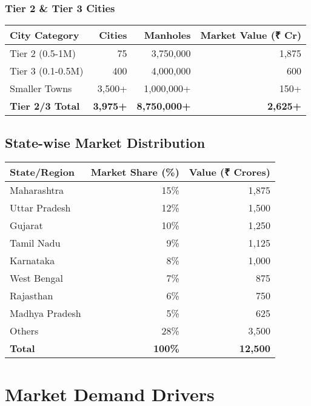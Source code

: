 \documentclass[11pt,a4paper]{article}
\begin{document}
\subsubsection{Tier 2 \& Tier 3 Cities}
\begin{center}
\begin{tabular}{lrrr}
\toprule
\textbf{City Category} & \textbf{Cities} & \textbf{Manholes} & \textbf{Market Value (₹ Cr)} \\
\midrule
Tier 2 (0.5-1M) & 75 & 3,750,000 & 1,875 \\
Tier 3 (0.1-0.5M) & 400 & 4,000,000 & 600 \\
Smaller Towns & 3,500+ & 1,000,000+ & 150+ \\
\midrule
\textbf{Tier 2/3 Total} & \textbf{3,975+} & \textbf{8,750,000+} & \textbf{2,625+} \\
\bottomrule
\end{tabular}
\end{center}

\subsection{State-wise Market Distribution}

\begin{center}
\begin{tabular}{lrr}
\toprule
\textbf{State/Region} & \textbf{Market Share (\%)} & \textbf{Value (₹ Crores)} \\
\midrule
Maharashtra & 15\% & 1,875 \\
Uttar Pradesh & 12\% & 1,500 \\
Gujarat & 10\% & 1,250 \\
Tamil Nadu & 9\% & 1,125 \\
Karnataka & 8\% & 1,000 \\
West Bengal & 7\% & 875 \\
Rajasthan & 6\% & 750 \\
Madhya Pradesh & 5\% & 625 \\
Others & 28\% & 3,500 \\
\midrule
\textbf{Total} & \textbf{100\%} & \textbf{12,500} \\
\bottomrule
\end{tabular}
\end{center}

\section{Market Demand Drivers}
\end{document}
